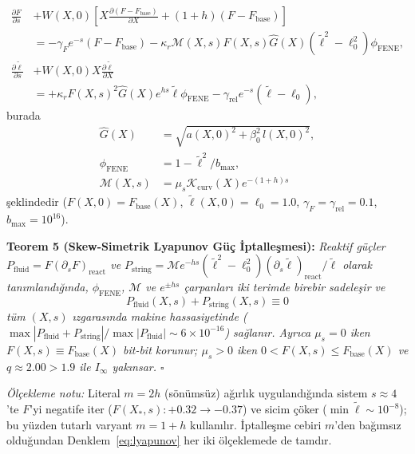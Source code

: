 \documentclass[12pt,a4paper]{article}
\begin{document}
\begin{equation}
\begin{split}
\frac{\partial F}{\partial s} &+ W(X,0) \left[ X \frac{\partial (F - F_{\mathrm{base}})}{\partial X} + (1+h)(F - F_{\mathrm{base}}) \right] \\
&= -\gamma_F e^{-s}(F - F_{\mathrm{base}}) - \kappa_r \mathcal{M}(X, s) F(X, s) \hat{G}(X) (\tilde{\ell}^2 - \ell_0^2) \phi_{\mathrm{FENE}}, \\
\frac{\partial \tilde{\ell}}{\partial s} &+ W(X,0) X \frac{\partial \tilde{\ell}}{\partial X} \\
&= +\kappa_r F(X, s)^2 \hat{G}(X) e^{h s} \tilde{\ell} \phi_{\mathrm{FENE}} - \gamma_{\mathrm{rel}} e^{-s}(\tilde{\ell} - \ell_0),
\end{split}
\label{eq:twofield}
\end{equation}
burada
\begin{align*}
\hat{G}(X) &= \sqrt{a(X,0)^2 + \beta_0^2 \, l(X,0)^2}, \\
\phi_{\mathrm{FENE}} &= 1 - \tilde{\ell}^2/b_{\max}, \\
\mathcal{M}(X, s) &= \mu_s \mathcal{K}_{\mathrm{curv}}(X) e^{-(1+h)s}
\end{align*}
şeklindedir ($F(X,0) = F_{\mathrm{base}}(X)$, $\tilde{\ell}(X,0) = \ell_0 = 1.0$, $\gamma_F = \gamma_{\mathrm{rel}} = 0.1$, $b_{\max} = 10^{16}$).

\textbf{Teorem 5 (Skew-Simetrik Lyapunov Güç İptalleşmesi):} \textit{Reaktif güçler $P_{\mathrm{fluid}} = F(\partial_s F)_{\mathrm{react}}$ ve $P_{\mathrm{string}} = \mathcal{M}e^{-hs}(\tilde{\ell}^2-\ell_0^2)(\partial_s\tilde{\ell})_{\mathrm{react}}/\tilde{\ell}$ olarak tanımlandığında, $\phi_{\mathrm{FENE}}$, $\mathcal{M}$ ve $e^{\pm hs}$ çarpanları iki terimde birebir sadeleşir ve}
\begin{equation}
P_{\mathrm{fluid}}(X, s) + P_{\mathrm{string}}(X, s) \equiv 0
\label{eq:lyapunov}
\end{equation}
\textit{tüm $(X, s)$ ızgarasında makine hassasiyetinde ($\max|P_{\mathrm{fluid}} + P_{\mathrm{string}}|/\max|P_{\mathrm{fluid}}| \sim 6 \times 10^{-16}$) sağlanır. Ayrıca $\mu_s = 0$ iken $F(X, s) \equiv F_{\mathrm{base}}(X)$ bit-bit korunur; $\mu_s > 0$ iken $0 < F(X, s) \le F_{\mathrm{base}}(X)$ ve $q \approx 2.00 > 1.9$ ile $I_\infty$ yakınsar. $\square$}

\textit{Ölçekleme notu:} Literal $m = 2h$ (sönümsüz) ağırlık uygulandığında sistem $s \approx 4$'te $F$'yi negatife iter ($F(X_*, s): +0.32 \to -0.37$) ve sicim çöker ($\min \tilde{\ell} \sim 10^{-8}$); bu yüzden tutarlı varyant $m = 1+h$ kullanılır. İptalleşme cebiri $m$'den bağımsız olduğundan Denklem~\eqref{eq:lyapunov} her iki ölçeklemede de tamdır.
\end{document}

